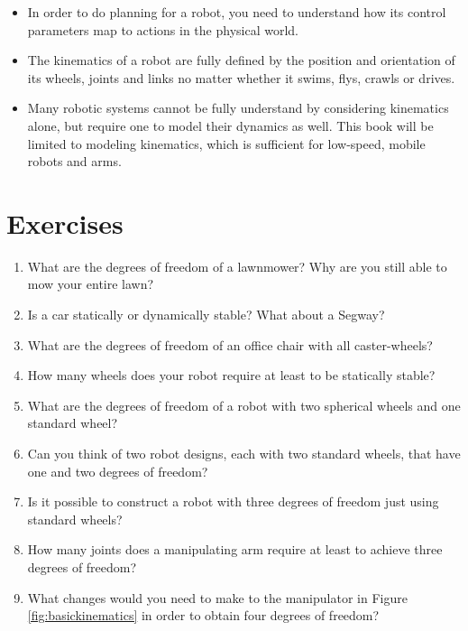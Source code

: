 \begin{itemize}
\item In order to do planning for a robot, you need to understand how its control parameters map to actions in the physical world.
\item The kinematics of a robot are fully defined by the position and orientation of its wheels, joints and links no matter whether it swims, flys, crawls or drives.
\item Many robotic systems cannot be fully understand by considering kinematics alone, but require one to model their dynamics as well. This book will be limited to modeling kinematics, which is sufficient for low-speed, mobile robots and arms.
\end{itemize} 

\section*{Exercises}
\small
\begin{enumerate}
\item What are the degrees of freedom of a lawnmower? Why are you still able to mow your entire lawn?
\item Is a car statically or dynamically stable? What about a Segway?
\item What are the degrees of freedom of an office chair with all caster-wheels?
\item How many wheels does your robot require at least to be statically stable?
\item What are the degrees of freedom of a robot with two spherical wheels and one standard wheel?
\item Can you think of two robot designs, each with two standard wheels, that have one and two degrees of freedom?
\item Is it possible to construct a robot with three degrees of freedom just using standard wheels? 
\item How many joints does a manipulating arm require at least to achieve three degrees of freedom?
\item What changes would you need to make to the manipulator in Figure \ref{fig:basickinematics} in order to obtain four degrees of freedom?
\end{enumerate}